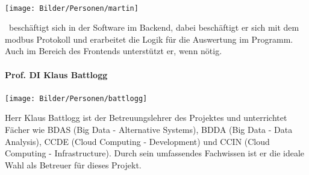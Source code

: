 \paragraph{\schneider}
\begin{minipage}{0.37\textwidth}
	\centering
	\texttt{[image: Bilder/Personen/martin]}
\end{minipage}
\hfill
\begin{minipage}{0.6\textwidth}
    \schneider \ beschäftigt sich in der Software im Backend, dabei beschäftigt er sich mit dem \gls{modbus} Protokoll und erarbeitet die Logik für die Auswertung im Programm. Auch im Bereich des Frontends unterstützt er, wenn nötig.
\end{minipage}%
\vspace{1ex}

\paragraph{Prof. DI Klaus Battlogg}
\begin{minipage}{0.37\textwidth}
	\centering
	\texttt{[image: Bilder/Personen/battlogg]}
\end{minipage}
\hfill
\begin{minipage}{0.6\textwidth}
	Herr Klaus Battlogg ist der Betreuungslehrer des Projektes und unterrichtet Fächer wie BDAS (Big Data - Alternative Systems), BDDA (Big Data - Data Analysis), CCDE (Cloud Computing - Development) und CCIN (Cloud Computing - Infrastructure). Durch sein umfassendes Fachwissen ist er die ideale Wahl als Betreuer für dieses Projekt.
\end{minipage}%
\vspace{1ex}

